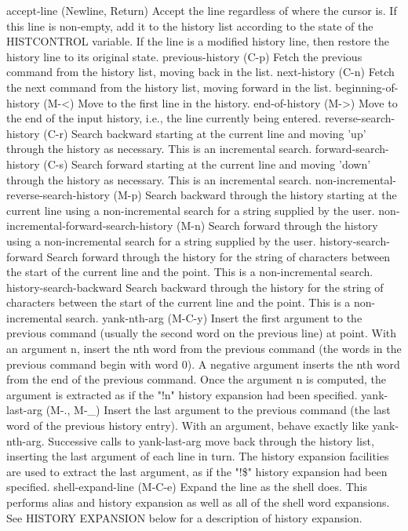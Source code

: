 accept-line (Newline, Return)
Accept the line regardless of where the cursor is. If this line is non-empty, add it to the history list according to the state of the HISTCONTROL variable. If the line is a modified history line, then restore the history line to its original state.
previous-history (C-p)
Fetch the previous command from the history list, moving back in the list.
next-history (C-n)
Fetch the next command from the history list, moving forward in the list.
beginning-of-history (M-<)
Move to the first line in the history.
end-of-history (M->)
Move to the end of the input history, i.e., the line currently being entered.
reverse-search-history (C-r)
Search backward starting at the current line and moving 'up' through the history as necessary. This is an incremental search.
forward-search-history (C-s)
Search forward starting at the current line and moving 'down' through the history as necessary. This is an incremental search.
non-incremental-reverse-search-history (M-p)
Search backward through the history starting at the current line using a non-incremental search for a string supplied by the user.
non-incremental-forward-search-history (M-n)
Search forward through the history using a non-incremental search for a string supplied by the user.
history-search-forward
Search forward through the history for the string of characters between the start of the current line and the point. This is a non-incremental search.
history-search-backward
Search backward through the history for the string of characters between the start of the current line and the point. This is a non-incremental search.
yank-nth-arg (M-C-y)
Insert the first argument to the previous command (usually the second word on the previous line) at point. With an argument n, insert the nth word from the previous command (the words in the previous command begin with word 0). A negative argument inserts the nth word from the end of the previous command. Once the argument n is computed, the argument is extracted as if the "!n" history expansion had been specified.
yank-last-arg (M-., M-\_)
Insert the last argument to the previous command (the last word of the previous history entry). With an argument, behave exactly like yank-nth-arg. Successive calls to yank-last-arg move back through the history list, inserting the last argument of each line in turn. The history expansion facilities are used to extract the last argument, as if the "!\$" history expansion had been specified.
shell-expand-line (M-C-e)
Expand the line as the shell does. This performs alias and history expansion as well as all of the shell word expansions. See HISTORY EXPANSION below for a description of history expansion.
